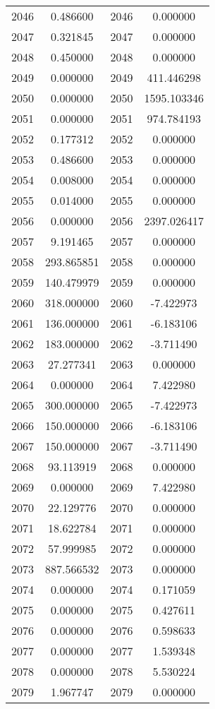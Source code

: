 \documentclass[12pt]{article}
\begin{document}
\begin{longtable}{@{}cccc@{}}
2046 & 0.486600 & 2046 & 0.000000 \\
2047 & 0.321845 & 2047 & 0.000000 \\
2048 & 0.450000 & 2048 & 0.000000 \\
2049 & 0.000000 & 2049 & 411.446298 \\
2050 & 0.000000 & 2050 & 1595.103346 \\
2051 & 0.000000 & 2051 & 974.784193 \\
2052 & 0.177312 & 2052 & 0.000000 \\
2053 & 0.486600 & 2053 & 0.000000 \\
2054 & 0.008000 & 2054 & 0.000000 \\
2055 & 0.014000 & 2055 & 0.000000 \\
2056 & 0.000000 & 2056 & 2397.026417 \\
2057 & 9.191465 & 2057 & 0.000000 \\
2058 & 293.865851 & 2058 & 0.000000 \\
2059 & 140.479979 & 2059 & 0.000000 \\
2060 & 318.000000 & 2060 & -7.422973 \\
2061 & 136.000000 & 2061 & -6.183106 \\
2062 & 183.000000 & 2062 & -3.711490 \\
2063 & 27.277341 & 2063 & 0.000000 \\
2064 & 0.000000 & 2064 & 7.422980 \\
2065 & 300.000000 & 2065 & -7.422973 \\
2066 & 150.000000 & 2066 & -6.183106 \\
2067 & 150.000000 & 2067 & -3.711490 \\
2068 & 93.113919 & 2068 & 0.000000 \\
2069 & 0.000000 & 2069 & 7.422980 \\
2070 & 22.129776 & 2070 & 0.000000 \\
2071 & 18.622784 & 2071 & 0.000000 \\
2072 & 57.999985 & 2072 & 0.000000 \\
2073 & 887.566532 & 2073 & 0.000000 \\
2074 & 0.000000 & 2074 & 0.171059 \\
2075 & 0.000000 & 2075 & 0.427611 \\
2076 & 0.000000 & 2076 & 0.598633 \\
2077 & 0.000000 & 2077 & 1.539348 \\
2078 & 0.000000 & 2078 & 5.530224 \\
2079 & 1.967747 & 2079 & 0.000000 \\

\end{longtable}
\end{document}
